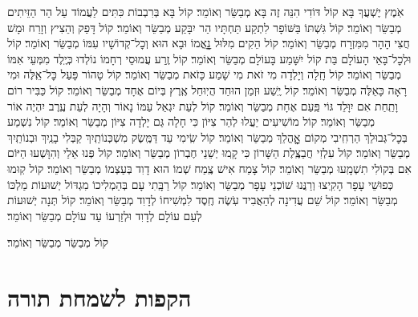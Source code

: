 \documentclass[twoside, openany, parskip=half, 11pt]{book}
\begin{document}
\begin{small}
אֹֽמֶץ יֶשְׁעֲךָ בָּא קוֹל דּוֹדִי הִנֵּה זֶה בָּא מְבַשֵּׂר וְאוֹמֵר׃
קוֹל בָּא בְּרִבְבוֹת כִּתִּים לַעֲמוֹד עַל הַר הַזֵּיתִים מְבַשֵּׂר וְאוֹמֵר׃
קוֹל גִּשְׁתּוֹ בַּשּׁוֹפָר לִתְקַע תַּחְתָּיו הַר יִבָּקַע מְבַשֵּׂר וְאוֹמֵר׃
קוֹל דָּפַק וְהֵצִיץ וְזָרַח וּמָשׁ חֲצִי הָהָר מִמִּזְרָח מְבַשֵּׂר וְאוֹמֵר׃
קוֹל הֵקִים מִלּוּל נׇׇׇׇאֳמוֹ וּבָא הוּא וְכׇל־קְדוֹשָׁיו עִמּוֹ מְבַשֵּׂר וְאוֹמֵר׃
קוֹל וּלְכׇל־בָּאֵי הָעוֹלָם בַּת קוֹל יִשָּׁמַע בָּעוֹלָם מְבַשֵּׂר וְאוֹמֵר׃
קוֹל זֶֽרַע עֲמוּסֵי רְחָמוֹ נוֹלְדוּ כְּיֶֽלֶד מִמְּעֵי אִמּוֹ מְבַשֵּׂר וְאוֹמֵר׃
קוֹל חָֽלָה וְיָלְדָה מִי זֹאת מִי שָׁמַע כָּזֹאת מְבַשֵּׂר וְאוֹמֵר׃
קוֹל טָהוֹר פָּעַל כׇּל־אֵֽלֶּה וּמִי רָאָה כָּאֵלֶּה מְבַשֵּׂר וְאוֹמֵר׃
קוֹל יֶֽשַׁע וּזְמַן הוּחַד הֲיֽוּחַל אֶֽרֶץ בְּיוֹם אֶחָד מְבַשֵּׂר וְאוֹמֵר׃
קוֹל כַּבִּיר רוֹם וָתַֽחַת אִם יִוָּלֵד גּוֹי פַּֽעַם אֶחָת מְבַשֵּׂר וְאוֹמֵר׃
קוֹל לְעֵת יִגְאַל עַמּוֹ נָאוֹר וְהָיָה לְעֵת עֶֽרֶב יִהְיֶה אוֹר מְבַשֵּׂר וְאוֹמֵר׃
קוֹל מוֹשִׁיעִים יַעֲלוּ לְהַר צִיּוֹן כִּי חָלָה גַּם יָלְדָה צִיּוֹן מְבַשֵּׂר וְאוֹמֵר׃
קוֹל נִשְׁמַע בְּכׇל־גְּבוּלֵךְ הַרְחִֽיבִי מְקוֹם אׇׇׇׇׇׇהֳלֵךְ מְבַשֵּׂר וְאוֹמֵר׃
קוֹל שִֽׂימִי עַד דַּמֶּֽשֶׂק מִשְׁכְּנוֹתַֽיִךְ קַבְּלִי בָנַֽיִךְ וּבְנוֹתַֽיִךְ מְבַשֵּׂר וְאוֹמֵר׃
קוֹל עִלְזִי חֲבַצֶּֽלֶת הַשָּׁרוֹן כִּי קָֽמוּ יְשֵׁנֵי חֶבְרוֹן מְבַשֵּׂר וְאוֹמֵר׃
קוֹל פְּנוּ אֵלַי וְהִוָּשְׁעוּ הַיּוֹם אִם בְּקוֹלִי תִשְׁמָֽעוּ מְבַשֵּׂר וְאוֹמֵר׃
קוֹל צָמַח אִישׁ צֶֽמַח שְׁמוֹ הוּא דָוִד בְּעַצְמוֹ מְבַשֵּׂר וְאוֹמֵר׃
קוֹל קֽוּמוּ כְּפוּשֵׁי עָפָר הָקִֽיצוּ וְרַנֲּנוּ שׁוֹכְנֵי עָפָר מְבַשֵּׂר וְאוֹמֵר׃
קוֹל רַבָּֽתִי עָם בְּהַמְלִיכוֹ מִגְדּוֹל יְשׁוּעוֹת מַלְכּוֹ מְבַשֵּׂר וְאוֹמֵר׃
קוֹל שֵׁם עֲדִינָה לְהַאֲבִיד עֹֽשֶׂה חֶֽסֶד לִמְשִׁיחוֹ לְדָוִד מְבַשֵּׂר וְאוֹמֵר׃
קוֹל תְּנָה יְשׁוּעוֹת לְעַם עוֹלָם לְדָוִד וּלְזַרְעוֹ עַד עוֹלָם מְבַשֵּׂר וְאוֹמֵר׃

\end{small}

\begin{large}
קוֹל מְבַשֵּׂר מְבַשֵּׂר וְאוֹמֵר׃

\end{large}

\hoshia


\chapter[הקפות לשמחת תורה]{ הקפות לשמחת תורה }
\end{document}
